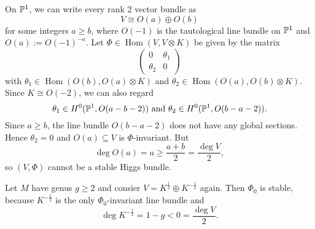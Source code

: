 \documentclass[A4paper, 12pt, british, reqno]{amsart}
\DeclareMathOperator{\Hom}{Hom}
\newcommand{\ot}{\otimes}
\newcommand{\op}{\oplus}
\begin{document}
\begin{exa}
    On $\P^{1}$, we can write every rank $2$ vector bundle as
    \[ V\cong O(a)\op O(b) \]
    for some integers $a\geqslant b$, where $O(-1)$ is the tautological line bundle on $\P^{1}$ and $O(a):=O(-1)^{-a}$.
    Let $\Phi\in \Hom(V,V\ot K)$ be given by the matrix
    \[
	\begin{pmatrix}
	    0 & \theta_{1} \\
	    \theta_{2} & 0
	\end{pmatrix}
    \]
    with $\theta_{1}\in \Hom(O(b),O(a)\ot K)$ and $\theta_{2}\in \Hom(O(a),O(b)\ot K)$.
    Since $K\cong O(-2)$, we can also regard
    \[ \theta_{1}\in H^{0}(\P^{1},O(a-b-2)) \text{ and } \theta_{2}\in H^{0}(\P^{1},O(b-a-2)). \]
    Since $a\geqslant b$, the line bundle $O(b-a-2)$ does not have any global sections.
    Hence $\theta_{2}=0$ and $O(a)\subseteq V$ is $\Phi$-invariant.
    But
    \[ \deg{O(a)}=a\geqslant \frac{a+b}{2}=\frac{\deg{V}}{2}, \]
    so $(V,\Phi)$ cannot be a stable Higgs bundle.
\end{exa}

\begin{exa}
    Let $M$ have genus $g\geqslant 2$ and consier $V=K^{\frac{1}{2}}\op K^{-\frac{1}{2}}$ again.
    Then $\Phi_{0}$ is stable, because $K^{-\frac{1}{2}}$ is the only $\Phi_{0}$-invariant line bundle and
    \[ \deg{K^{-\frac{1}{2}}}=1-g<0=\frac{\deg{V}}{2}. \]
\end{exa}
\end{document}
